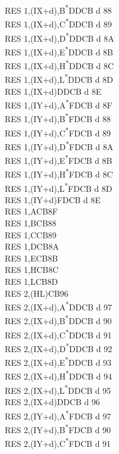 \documentclass[twoside,openright,a4paper]{book}
\begin{document}
\begin{multicols}{3}
{\begin{tabbing}
	RES 1,(IX+d),B\textsuperscript{*}\>DDCB d 88\\
	RES 1,(IX+d),C\textsuperscript{*}\>DDCB d 89\\
	RES 1,(IX+d),D\textsuperscript{*}\>DDCB d 8A\\
	RES 1,(IX+d),E\textsuperscript{*}\>DDCB d 8B\\
	RES 1,(IX+d),H\textsuperscript{*}\>DDCB d 8C\\
	RES 1,(IX+d),L\textsuperscript{*}\>DDCB d 8D\\
	RES 1,(IX+d)\>DDCB d 8E\\
	RES 1,(IY+d),A\textsuperscript{*}\>FDCB d 8F\\
	RES 1,(IY+d),B\textsuperscript{*}\>FDCB d 88\\
	RES 1,(IY+d),C\textsuperscript{*}\>FDCB d 89\\
	RES 1,(IY+d),D\textsuperscript{*}\>FDCB d 8A\\
	RES 1,(IY+d),E\textsuperscript{*}\>FDCB d 8B\\
	RES 1,(IY+d),H\textsuperscript{*}\>FDCB d 8C\\
	RES 1,(IY+d),L\textsuperscript{*}\>FDCB d 8D\\
	RES 1,(IY+d)\>FDCB d 8E\\
	RES 1,A\>CB8F\\
	RES 1,B\>CB88\\
	RES 1,C\>CB89\\
	RES 1,D\>CB8A\\
	RES 1,E\>CB8B\\
	RES 1,H\>CB8C\\
	RES 1,L\>CB8D\\
	RES 2,(HL)\>CB96\\
	RES 2,(IX+d),A\textsuperscript{*}\>DDCB d 97\\
	RES 2,(IX+d),B\textsuperscript{*}\>DDCB d 90\\
	RES 2,(IX+d),C\textsuperscript{*}\>DDCB d 91\\
	RES 2,(IX+d),D\textsuperscript{*}\>DDCB d 92\\
	RES 2,(IX+d),E\textsuperscript{*}\>DDCB d 93\\
	RES 2,(IX+d),H\textsuperscript{*}\>DDCB d 94\\
	RES 2,(IX+d),L\textsuperscript{*}\>DDCB d 95\\
	RES 2,(IX+d)\>DDCB d 96\\
	RES 2,(IY+d),A\textsuperscript{*}\>FDCB d 97\\
	RES 2,(IY+d),B\textsuperscript{*}\>FDCB d 90\\
	RES 2,(IY+d),C\textsuperscript{*}\>FDCB d 91\\

\end{tabbing}}
\end{multicols}
\end{document}
